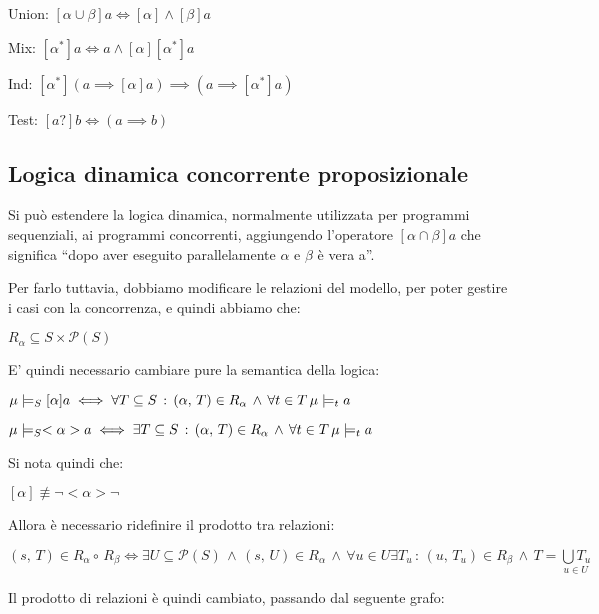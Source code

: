 Union: $[\alpha\cup\beta]a\iff[\alpha]\wedge[\beta]a$ 

Mix: $[\alpha^{*}]a\iff a\wedge[\alpha][\alpha^{*}]a$

Ind: $[\alpha^{*}](a\implies[\alpha]a)\implies(a\implies[\alpha^{*}]a)$

Test: $[a?]b\iff(a\implies b)$


\subsection{Logica dinamica concorrente proposizionale}

Si può estendere la logica dinamica, normalmente utilizzata per programmi
sequenziali, ai programmi concorrenti, aggiungendo l'operatore $[\alpha\cap\beta]a$
che significa ``dopo aver eseguito parallelamente $\alpha$ e $\beta$
è vera a''.

Per farlo tuttavia, dobbiamo modificare le relazioni del modello,
per poter gestire i casi con la concorrenza, e quindi abbiamo che:

$R_{\alpha}\subseteq S\times\mathcal{P}(S)$

E' quindi necessario cambiare pure la semantica della logica:

$\mu\models_{S}[\alpha]a\iff\forall T\subseteq S\,:\,(\alpha,\, T)\in R_{\alpha}\,\wedge\,\forall t\in T\,\mu\models_{t}a$

$\mu\models_{S}<\alpha>a\iff\exists T\subseteq S\,:\,(\alpha,\, T)\in R_{\alpha}\,\wedge\,\forall t\in T\,\mu\models_{t}a$

Si nota quindi che:

$[\alpha]\not\equiv\neg<\alpha>\neg$

Allora è necessario ridefinire il prodotto tra relazioni:

$(s,\, T)\in R_{\alpha}\circ\, R_{\beta}\iff\exists U\subseteq\mathcal{P}(S)\,\wedge\,(s,\, U)\in R_{\alpha}\,\wedge\,\forall u\in U\exists T_{u}\,:\,(u,\, T_{u})\in R_{\beta}\,\wedge\, T=\underset{u\in U}{\bigcup T_{u}}$

Il prodotto di relazioni è quindi cambiato, passando dal seguente
grafo:

\begin{center}  \end{center}

